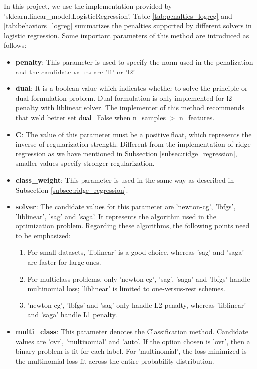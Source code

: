 \documentclass[10pt,journal,compsoc]{IEEEtran}
\begin{document}
In this project, we use the implementation provided by 'sklearn.linear\_model.LogisticRegression'. Table \ref{tab:penalties_logreg} and \ref{tab:behaviors_logreg} summarizes the penalties supported by different solvers in logistic regression. Some important parameters of this method are introduced as follows:
\begin{itemize}
  \item \textbf{penalty}: This parameter is used to specify the norm used in the penalization and the candidate values are 'l1' or 'l2'.
  \item \textbf{dual}: It is a boolean value which indicates whether to solve the principle or dual formulation problem. Dual formulation is only implemented for l2 penalty with liblinear solver. The implementer of this method recommends that we'd better set dual=False when n\_samples $>$ n\_features.
  \item \textbf{C}: The value of this parameter must be a positive float, which represents the inverse of regularization strength. Different from the implementation of ridge regression as we have mentioned in Subsection \ref{subsec:ridge_regression}, smaller values specify stronger regularization.
  \item \textbf{class\_weight}: This parameter is used in the same way as described in Subsection \ref{subsec:ridge_regression}.
  \item \textbf{solver}: The candidate values for this parameter are 'newton-cg', 'lbfgs', 'liblinear', 'sag' and 'saga'. It represents the algorithm used in the optimization problem. Regarding these algorithms, the following points need to be emphasized:
    \begin{enumerate}
      \item For small datasets, 'liblinear' is a good choice, whereas 'sag' and 'saga' are faster for large ones.
      \item For multiclass problems, only 'newton-cg', 'sag', 'saga' and 'lbfgs' handle multinomial loss; 'liblinear' is limited to one-versus-rest schemes.
      \item 'newton-cg', 'lbfgs' and 'sag' only handle L2 penalty, whereas 'liblinear' and 'saga' handle L1 penalty.
    \end{enumerate}
  \item \textbf{multi\_class}: This parameter denotes the Classification method. Candidate values are 'ovr', 'multinomial' and 'auto'. If the option chosen is 'ovr', then a binary problem is fit for each label. For 'multinomial', the loss minimized is the multinomial loss fit across the entire probability distribution.
\end{itemize}
\end{document}
